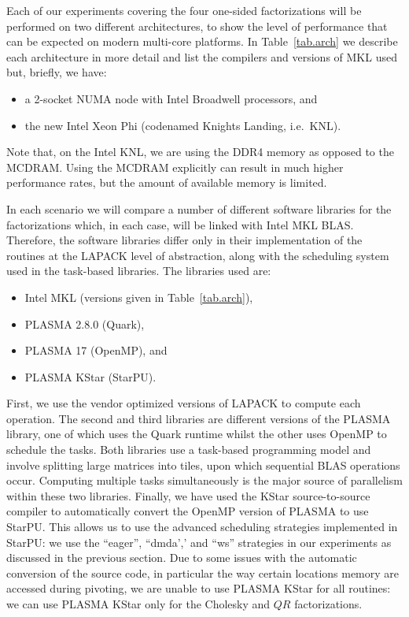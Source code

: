 \documentclass[a4paper,12pt]{article}
\begin{document}
Each of our experiments covering the four one-sided factorizations
will be performed on two different architectures,
to show the level of performance that can be expected on
modern multi-core platforms.
In Table~\ref{tab.arch} we describe each architecture in more detail
and list the compilers and versions of MKL used but,
briefly, we have:
\begin{itemize}
\item a 2-socket NUMA node with Intel Broadwell processors, and
\item the new Intel Xeon Phi (codenamed Knights Landing, i\@.e\@.~KNL).
\end{itemize}
Note that, on the Intel KNL,
we are using the DDR4 memory as opposed to the MCDRAM.
Using the MCDRAM explicitly can result in much higher performance
rates,
but the amount of available memory is limited.

In each scenario we will compare a number of different software libraries
for the factorizations which,
in each case,
will be linked with Intel MKL BLAS.
Therefore, the software libraries differ only in their
implementation of the routines at the LAPACK level of abstraction,
along with the scheduling system used in the task-based libraries.
The libraries used are:
\begin{itemize}
\item Intel MKL (versions given in Table~\ref{tab.arch}),
\item PLASMA 2.8.0 (Quark),
\item PLASMA 17 (OpenMP), and
\item PLASMA KStar (StarPU).
\end{itemize}

First,
we use the vendor optimized versions of LAPACK to compute each operation.
The second and third libraries are different versions of the PLASMA
library,
one of which uses the Quark runtime whilst the other uses OpenMP
to schedule the tasks.
Both libraries use a task-based programming model and involve
splitting large matrices into tiles,
upon which sequential BLAS operations occur.
Computing multiple tasks simultaneously is the major source of parallelism
within these two libraries.
Finally,
we have used the KStar source-to-source compiler to automatically
convert the OpenMP version of PLASMA to use StarPU.
This allows us to use the advanced scheduling strategies implemented
in StarPU:
we use the ``eager'', ``dmda',' and ``ws'' strategies in our
experiments as discussed in the previous section.
Due to some issues with the automatic conversion of the source code,
in particular the way certain locations memory are accessed during pivoting,
we are unable to use PLASMA KStar for all routines:
we can use PLASMA KStar only for the Cholesky and $QR$ factorizations.
\end{document}
